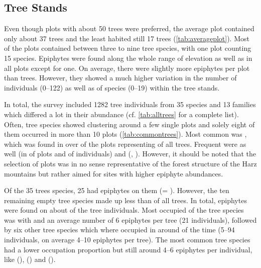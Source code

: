 \documentclass[12pt, a4paper, oneside, draft]{scrartcl}
\begin{document}



	\subsection{Tree Stands}
	Even though plots with about 50 trees were preferred, the average plot contained only about 37 trees and the least habited still 17 trees (\autoref{tab:averageplot}). Most of the plots contained between three to nine tree species, with one plot counting 15 species. Epiphytes were found along the whole range of elevation as well as in all plots except for one. On average, there were slightly more epiphytes per plot than trees. However, they showed a much higher variation in the number of individuals (0--122) as well as of species (0--19) within the tree stands. 
	
	
	
	In total, the survey included 1282 tree individuals from 35 species and 13 families which differed a lot in their abundance (cf. \autoref{tab:alltrees} for a complete list).  Often, tree species showed clustering around a few single plots and solely eight of them occurred in more than 10 plots (\autoref{tab:commontrees}). Most common was \apseudoplatanus, which was found in over  of the plots representing  of all trees. Frequent were as well \aplatanoides (in  of plots and  of individuals) and \fexcelsior (, ). However, it should be noted that the selection of plots was in no sense representative of the forest structure of the Harz mountains but rather aimed for sites with higher epiphyte abundances.
	
	Of the 35 trees species, 25 had epiphytes on them (= ). However, the ten remaining empty tree species made up less than  of all trees. In total, epiphytes were found on about  of the tree individuals. Most occupied of the tree species was \salba with  and an average number of 6 epiphytes per tree (21  individuals), followed by six other tree species which where occupied in around  of the time (5--94 individuals, on average 4--10 epiphytes per tree). The most common tree species had a lower occupation proportion but still around 4--6 epiphytes per individual, like \apseudoplatanus (), \aplatanoides () and \fexcelsior (). 
	
\end{document}
